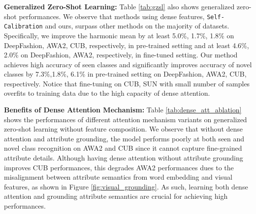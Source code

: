 \documentclass[10pt,journal,compsoc]{IEEEtran}
\newcommand{\1}{\boldsymbol{1}}
\newcommand{\0}{\boldsymbol{0}}
\newcommand{\<}{\langle}
\renewcommand{\>}{\rangle}
\newcommand{\myparagraph}[1]{\vspace{-2pt}\medskip\noindent\textbf{#1}}
\begin{document}
\myparagraph{Generalized Zero-Shot Learning:}
Table \ref{tab:gzsl} also shows generalized zero-shot performances. 
We observe that methods using dense features, \texttt{Self-Calibration} and ours, surpass other methods on the majority of datasets.
Specifically, we improve the harmonic mean by at least 5.0\%, 1.7\%, 1.8\% on DeepFashion, AWA2, CUB, respectively, in pre-trained setting and at least 4.6\%, 2.0\% on DeepFashion, AWA2, respectively, in fine-tuned setting.
Our method achieves high accuracy of seen classes and significantly improves accuracy of novel classes by 7.3\%,1.8\%, 6.1\% in pre-trained setting on DeepFashion, AWA2, CUB, respectively.
Notice that fine-tuning on CUB, SUN with small number of samples overfits to training data due to the high capacity of dense attention.

\myparagraph{Benefits of Dense Attention Mechanism:}
Table \ref{tab:dense_att_ablation} shows the performances of different attention mechanism variants on generalized zero-shot learning without feature composition.
We observe that without dense attention and attribute grounding, the model performs poorly at both seen and novel class recognition on AWA2 and CUB since it cannot capture fine-grained attribute details.
Although having dense attention without attribute grounding improves CUB performances, this degrades AWA2 performances dues to the misalignment between attribute semantics from word embedding and visual features, as shown in Figure \ref{fig:visual_grounding}.
As such, learning both dense attention and grounding attribute semantics are crucial for achieving high performances. 

\begin{table}
\centering
{}
\caption{\small{Ablation study of dense attention mechanism without feature composition on the CUB and AWA2 datasets.}}
\label{tab:dense_att_ablation}
\end{table}
\end{document}
